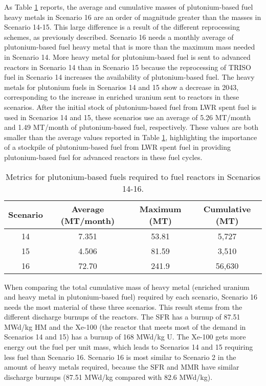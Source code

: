 As Table \ref{tab:s14-16_mox} reports, the average and cumulative 
masses of plutonium-based fuel heavy metals in Scenario 16 are an 
order of magnitude greater than the masses in Scenario 14-15. 
This large difference 
is a result of the different reprocessing schemes, as previously 
described. 
Scenario 16 needs a monthly average 
of plutonium-based fuel heavy metal that is more than the maximum mass 
needed in Scenario 14. More heavy metal for plutonium-based fuel
is sent to advanced reactors in Scenario 14 than  
in Scenario 15 because the reprocessing of \gls{TRISO} fuel in 
Scenario 14 increases the availability of 
plutonium-based fuel. The heavy metals for plutonium fuels 
in Scenarios 14 and 15 show a decrease in 2043, corresponding 
to the increase in enriched uranium sent to reactors in these 
scenarios. After the initial stock of plutonium-based fuel 
from \gls{LWR} spent fuel is used in Scenarios 14 and 15, these 
scenarios use an 
average of 5.26 MT/month and 1.49 MT/month of plutonium-based 
fuel, respectively. These 
values are both smaller than the average values reported 
in Table \ref{tab:s14-16_mox}, highlighting the importance 
of a stockpile of plutonium-based fuel from \gls{LWR} spent 
fuel in providing plutonium-based fuel for advanced reactors in these fuel 
cycles. 

\begin{table}[h!]
    \centering 
    \caption{Metrics for plutonium-based fuels required to fuel reactors 
    in Scenarios 14-16.}
    \label{tab:s14-16_mox}
    \begin{tabular}{c c c c}
        \hline 
        Scenario & Average (MT/month) & Maximum (MT) & Cumulative (MT) \\
        \hline 
        14 & 7.351 & 53.81 & 5,727 \\
        15 & 4.506 & 81.59 & 3,510 \\
        16 & 72.70 & 241.9 & 56,630 \\
        \hline
        
    \end{tabular}
\end{table}

When comparing the total cumulative mass of heavy metal (enriched 
uranium and heavy metal in plutonium-based fuel) required by each scenario,
Scenario 16 needs the most material of these three scenarios. This 
result stems from the different discharge burnups of the reactors. The 
\gls{SFR} has a burnup of 87.51 MWd/kg HM and the Xe-100 (the reactor that 
meets most of the demand in Scenarios 14 and 15) has a burnup of 168 MWd/kg U. 
The Xe-100 gets more energy out the fuel per unit mass, which leads to 
Scenarios 14 and 15 requiring less fuel than Scenario 16. Scenario 16 is most 
similar to Scenario 2 in the amount of heavy metals required, because
the \gls{SFR} and \gls{MMR} have similar discharge burnups (87.51 MWd/kg 
compared with 82.6 MWd/kg).

